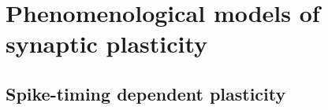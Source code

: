 \documentclass{beamer}
\begin{document}

\section{Phenomenological models of synaptic plasticity}



\subsection{Spike-timing dependent plasticity}
\end{document}
